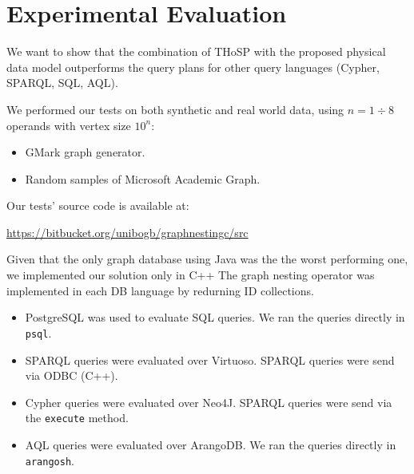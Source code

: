 \section{Experimental Evaluation}
\begin{lucido}[Dataset]
	We want to show that the combination of THoSP with the proposed physical data model outperforms the query plans for other query languages (Cypher, SPARQL, SQL, AQL).
	
	We performed our tests on both synthetic and real world data, using  $n=1\div 8$ operands with vertex size $10^n$:
	\begin{itemize}
		\item GMark graph generator.
		\item Random samples of Microsoft Academic Graph.
	\end{itemize} 
	
	Our tests' source code is available at:
	\begin{center}
		\url{https://bitbucket.org/unibogb/graphnestingc/src}
	\end{center}
\end{lucido}

\begin{lucido}
Given that the only graph database using Java was the the worst performing one, we implemented our solution only in C++ The graph nesting operator was implemented in each DB language by redurning ID collections.
	
\begin{itemize}
	\item PostgreSQL was used to evaluate SQL queries. We ran the queries directly in \texttt{psql}.
	\item SPARQL queries were evaluated over Virtuoso. SPARQL queries were send via ODBC (C++).
	\item Cypher queries were evaluated over Neo4J. SPARQL queries were send via the \texttt{execute} method.
	\item AQL queries were evaluated over ArangoDB.  We ran the queries directly in \texttt{arangosh}.
\end{itemize}
\end{lucido}

